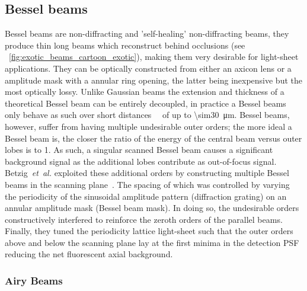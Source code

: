 \subsection{Bessel beams}

\gls{Bessel beam}s are non-diffracting and 'self-healing' non-diffracting beams, they produce thin long beams which reconstruct behind occlusions (see \figurename~\ref{fig:exotic_beams_cartoon_exotic}), making them very desirable for light-sheet applications.
They can be optically constructed from either an \gls{axicon} lens or a amplitude mask with a annular ring opening, the latter being inexpensive but the most optically lossy.
Unlike Gaussian beams the extension and thickness of a theoretical \gls{Bessel beam} can be entirely decoupled, in practice a \gls{Bessel beam}s only behave as such over short distances~~\cite{gao_3d_2014} of up to \SI{\sim30}{\micro\meter}.
\gls{Bessel beam}s, however, suffer from having multiple undesirable outer orders; the more ideal a \gls{Bessel beam} is, the closer the ratio of the energy of the central beam versus outer lobes is to \SI{1}{}.
As such, a singular scanned \gls{Bessel beam} causes a significant background signal as the additional lobes contribute as out-of-focus signal.
Betzig~\emph{et~al.} exploited these additional orders by constructing multiple \gls{Bessel beam}s in the scanning plane~\cite{chen_lattice_2014}.
The spacing of which was controlled by varying the periodicity of the
sinusoidal amplitude pattern (diffraction grating) on an annular amplitude mask (\gls{Bessel beam} mask).
In doing so, the undesirable orders constructively interfered to reinforce the zeroth orders of the parallel beams.
Finally, they tuned the periodicity \gls{lattice light-sheet} such that the outer orders above and below the scanning plane lay at the first minima in the detection \gls{PSF} reducing the net fluorescent axial background.

\subsubsection{Airy Beams}

